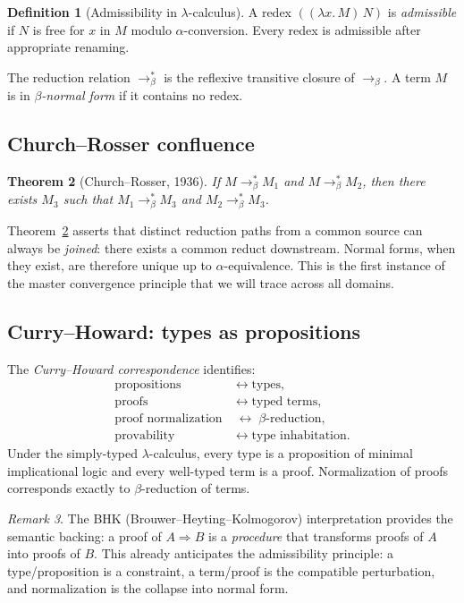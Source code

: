 \documentclass[12pt, a4paper]{article}
\theoremstyle{plain}
\newtheorem{theorem}{Theorem}[section]
\theoremstyle{definition}
\newtheorem{definition}[theorem]{Definition}
\theoremstyle{remark}
\newtheorem{remark}[theorem]{Remark}
\newcommand{\betal}{\to_{\beta}}
\newcommand{\betastar}{\to_{\beta}^{*}}
\newcommand{\Lam}[2]{\lambda #1.\, #2}
\newcommand{\App}[2]{(#1\, #2)}
\begin{document}
\begin{definition}[Admissibility in $\lambda$-calculus]
  A redex $\App{(\Lam{x}{M})}{N}$ is \emph{admissible} if $N$ is
  free for $x$ in $M$ modulo $\alpha$-conversion.
  Every redex is admissible after appropriate renaming.
\end{definition}

The reduction relation $\betastar$ is the reflexive transitive closure of
$\betal$.
A term $M$ is in \emph{$\beta$-normal form} if it contains no redex.

\subsection{Church--Rosser confluence}

\begin{theorem}[Church--Rosser, 1936]
  \label{thm:cr}
  If $M \betastar M_1$ and $M \betastar M_2$, then there exists $M_3$
  such that $M_1 \betastar M_3$ and $M_2 \betastar M_3$.
\end{theorem}

Theorem~\ref{thm:cr} asserts that distinct reduction paths from a
common source can always be \emph{joined}: there exists a common
reduct downstream.
Normal forms, when they exist, are therefore unique up to
$\alpha$-equivalence.
This is the first instance of the master convergence principle that we
will trace across all domains.

\subsection{Curry--Howard: types as propositions}

The \emph{Curry--Howard correspondence} identifies:
\begin{align*}
  \text{propositions} &\;\leftrightarrow\; \text{types,}\\
  \text{proofs}       &\;\leftrightarrow\; \text{typed terms,}\\
  \text{proof normalization} &\;\leftrightarrow\; \text{$\beta$-reduction,}\\
  \text{provability}  &\;\leftrightarrow\; \text{type inhabitation.}
\end{align*}
Under the simply-typed $\lambda$-calculus, every type is a proposition
of minimal implicational logic and every well-typed term is a proof.
Normalization of proofs corresponds exactly to $\beta$-reduction of terms.

\begin{remark}
  The BHK (Brouwer--Heyting--Kolmogorov) interpretation provides the
  semantic backing: a proof of $A \Rightarrow B$ is a \emph{procedure}
  that transforms proofs of $A$ into proofs of $B$.
  This already anticipates the admissibility principle:
  a type/proposition is a constraint, a term/proof is the compatible
  perturbation, and normalization is the collapse into normal form.
\end{remark}
\end{document}
